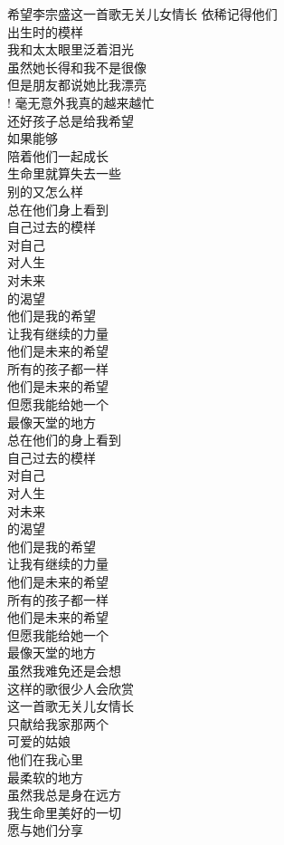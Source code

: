 \begin{poem}{希望}{李宗盛}{这一首歌无关儿女情长}
依稀记得他们\\
出生时的模样\\
我和太太眼里泛着泪光\\
虽然她长得和我不是很像\\
但是朋友都说她比我漂亮\\!
毫无意外我真的越来越忙\\
还好孩子总是给我希望\\
如果能够\\
陪着他们一起成长\\
生命里就算失去一些\\
别的又怎么样\\
总在他们身上看到\\
自己过去的模样\\
对自己\\
对人生\\
对未来\\
的渴望\\
他们是我的希望\\
让我有继续的力量\\
他们是未来的希望\\
所有的孩子都一样\\
他们是未来的希望\\
但愿我能给她一个\\
最像天堂的地方\\
总在他们的身上看到\\
自己过去的模样\\
对自己\\
对人生\\
对未来\\
的渴望\\
他们是我的希望\\
让我有继续的力量\\
他们是未来的希望\\
所有的孩子都一样\\
他们是未来的希望\\
但愿我能给她一个\\
最像天堂的地方\\
虽然我难免还是会想\\
这样的歌很少人会欣赏\\
这一首歌无关儿女情长\\
只献给我家那两个\\
可爱的姑娘\\
他们在我心里\\
最柔软的地方\\
虽然我总是身在远方\\
我生命里美好的一切\\
愿与她们分享\\
\end{poem}
